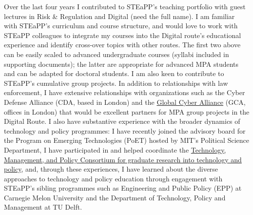 \documentclass[11pt]{letter}
\begin{document}
\begin{letter}
Over the last four years I contributed to STEaPP's teaching portfolio with guest lectures in Risk \& Regulation and Digital (need the full name).
%
I am familiar with STEaPP's curriculum and course structure, and would love to work with STEaPP colleagues to integrate my courses into the Digital route's educational experience and identify cross-over topics with other routes.
%
The first two above can be easily scaled to advanced undergraduate courses (syllabi included in supporting documents); the latter are appropriate for advanced MPA students and can be adapted for doctoral students.
%
I am also keen to contribute to STEaPP's cumulative group projects.
%
In addition to relationships with law enforcement, I have extensive relationships with organizations such as the Cyber Defense Alliance (CDA, based in London) and the \href{https://www.globalcyberalliance.org/}{Global Cyber Alliance} (GCA, offices in London) that would be excellent partners for MPA group projects in the Digital Route.
%
I also have substantive experience with the broader dynamics of technology and policy programmes: I have recently joined the advisory board for the Program on Emerging Technologies (PoET) hosted by MIT's Political Science Department, I have participated in and helped coordinate the \href{https://www.tudelft.nl/en/tpm/about-the-faculty/organisation-chart-facts-figures/mission}{Technology, Management, and Policy Consortium for graduate research into technology and policy}, and, through these experiences, I have learned about the diverse approaches to technology and policy education through engagement with STEaPP's sibling programmes such as Engineering and Public Policy (EPP) at Carnegie Melon University and the Department of Technology, Policy and Management at TU Delft.    


\end{letter}
\end{document}
